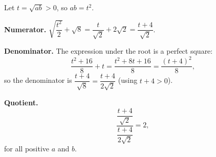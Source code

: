 Let $t=\sqrt{ab}>0$, so $ab=t^2$.

\textbf{Numerator.} $\sqrt{\dfrac{t^2}{2}}+\sqrt8=\dfrac{t}{\sqrt2}+2\sqrt2=\dfrac{t+4}{\sqrt2}$.

\textbf{Denominator.} The expression under the root is a perfect square:
\[
\dfrac{t^2+16}{8}+t=\dfrac{t^2+8t+16}{8}=\dfrac{(t+4)^2}{8},
\]
so the denominator is $\dfrac{t+4}{\sqrt8}=\dfrac{t+4}{2\sqrt2}$ (using $t+4>0$).

\textbf{Quotient.}
\[
\dfrac{\dfrac{t+4}{\sqrt2}}{\dfrac{t+4}{2\sqrt2}}=\boxed{2},
\]
for all positive $a$ and $b$.
